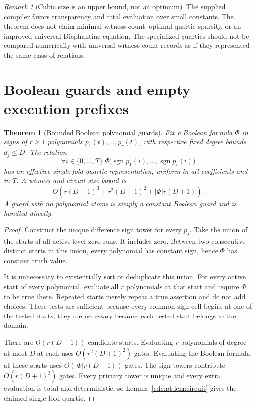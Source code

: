 \documentclass[11pt,a4paper]{article}
\newtheorem{theorem}{Theorem}[section]
\theoremstyle{definition}
\theoremstyle{remark}
\newtheorem{remark}[remark]{Remark}
\newcommand{\sgn}{\operatorname{sgn}}
\newcommand{\srctag}[1]{\texorpdfstring{\hspace{0.5em}{\normalfont\small\color{accent}[#1]}}{ [#1]}}
\begin{document}
\begin{remark}[Cubic size is an upper bound, not an optimum]
The supplied compiler favors transparency and total evaluation over small
constants. The theorem does not claim minimal witness count, optimal
quartic sparsity, or an improved universal Diophantine equation. The
specialized quartics should not be compared numerically with universal
witness-count records as if they represented the same class of relations.
\end{remark}

\section{Boolean guards and empty execution prefixes\srctag{02}}
\label{cdc:pt:sec:boolean}

\begin{theorem}[Bounded Boolean polynomial guards]
\label{cdc:pt:thm:boolean}
Fix a Boolean formula $\Phi$ in signs of $r\geq1$ polynomials
$p_1(t),\ldots,p_r(t)$, with respective fixed degree bounds $d_j\leq D$.
The relation
\[
 \forall i\in\{0,\ldots,T\}\;
 \Phi\bigl(\sgn p_1(i),\ldots,\sgn p_r(i)\bigr)
\]
has an effective single-fold quartic representation, uniform in all
coefficients and in $T$. A witness and circuit size bound is
\[
 O\!\left(r(D+1)^3+r^2(D+1)^2+|\Phi|r(D+1)\right).
\]
A guard with no polynomial atoms is simply a constant Boolean guard and is
handled directly.
\end{theorem}
\begin{proof}
Construct the unique difference sign tower for every $p_j$. Take the union
of the starts of all active level-zero runs. It includes zero. Between two
consecutive distinct starts in this union, every polynomial has constant
sign, hence $\Phi$ has constant truth value.

It is unnecessary to existentially sort or deduplicate this union. For
every active start of every polynomial, evaluate all $r$ polynomials at
that start and require $\Phi$ to be true there. Repeated starts merely
repeat a true assertion and do not add choices. These tests are sufficient
because every common sign cell begins at one of the tested starts; they
are necessary because each tested start belongs to the domain.

There are $O(r(D+1))$ candidate starts. Evaluating $r$ polynomials of
degree at most $D$ at each uses $O(r^2(D+1)^2)$ gates. Evaluating the
Boolean formula at these starts uses $O(|\Phi|r(D+1))$ gates. The sign
towers contribute $O(r(D+1)^3)$ gates. Every primary tower is unique and
every extra evaluation is total and deterministic, so
Lemma~\ref{cdc:pt:lem:circuit} gives the claimed single-fold quartic.
\end{proof}
\end{document}
